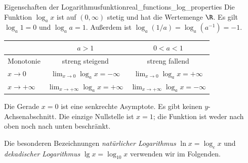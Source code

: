 \begin{TheoremBox}{Eigenschaften der Logarithmusfunktion}{real_functions_log_properties}
  Die Funktion $\log_a x$ ist auf $(0,\infty)$ stetig und hat die
  \textcolor{green!55!black}{Wertemenge} $\R$. Es gilt $\log_a1=0$ und $\log_a a=1$.
  Außerdem ist $\log_a(1/a)=\log_a(a^{-1})=-1$.
  \begin{center}
    \renewcommand{\arraystretch}{1.4}
    \begin{tabular}{@{}lcc@{}}
      \toprule
       & $a>1$ & $0<a<1$\\ \midrule
      Monotonie & streng steigend & streng fallend\\
      $x\to0$ & $\lim_{x\to0}\log_a x=-\infty$ & $\lim_{x\to0}\log_a x=+\infty$\\
      $x\to+\infty$ & $\lim_{x\to+\infty}\log_a x=+\infty$ & $\lim_{x\to+\infty}\log_a x=-\infty$\\
      \bottomrule
    \end{tabular}
  \end{center}
  Die Gerade $x=0$ ist eine senkrechte Asymptote. Es gibt keinen
  $y$-Achsenabschnitt.
  Die einzige Nullstelle ist $x=1$; die Funktion ist weder nach oben
  noch nach unten beschränkt.
\end{TheoremBox}
Die besonderen Bezeichnungen
\emph{natürlicher Logarithmus} 
$\ln x=\log_e x$ und \emph{dekadischer Logarithmus}
 $\lg x=\log_{10}x$ verwenden wir im Folgenden.

